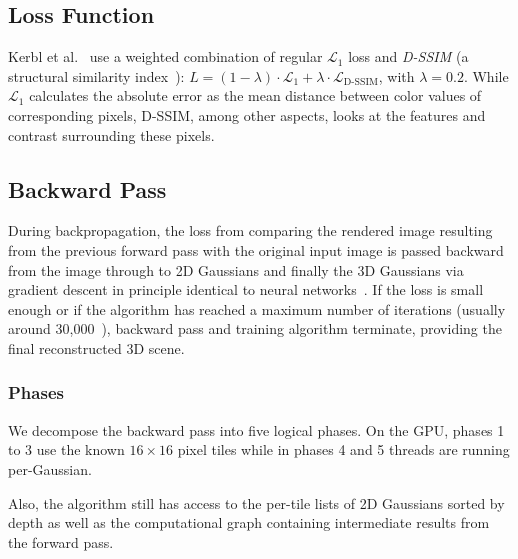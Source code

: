 \vspace{-5pt}
\subsection{Loss Function}
\vspace{-3pt}
Kerbl et al.~\cite{kerbl3DGaussianSplatting2023} use a weighted combination of regular $\mathcal{L}_1$ loss and \textit{D-SSIM} (a structural similarity index~\cite{wangImageQualityAssessment2004}):
$L = (1 - \lambda) \cdot \mathcal{L}_1 + \lambda \cdot \mathcal{L}_\text{D-SSIM}$, with $\lambda=0.2$. While $\mathcal{L}_1$ calculates the absolute error as the mean distance between color values of corresponding pixels, D-SSIM, among other aspects, looks at the features and contrast surrounding these pixels.

\subsection{Backward Pass}
\label{ch:backprop}
During backpropagation, the loss from comparing the rendered image resulting from the previous forward pass with the original input image is passed backward from the image through to 2D Gaussians and finally the 3D Gaussians via gradient descent in principle identical to neural networks~\cite{thimm2025ML}.
If the loss is small enough or if the algorithm has reached a maximum number of iterations (usually around 30,000~\cite{kerbl3DGaussianSplatting2023}), backward pass and training algorithm terminate, providing the final reconstructed 3D scene.

\vspace{-8pt}
\subsubsection{Phases}
\label{ch:backprop:phases}
\vspace{-3pt}
We decompose the backward pass into five logical phases. On the GPU, phases 1 to 3 use the known $16\times 16$ pixel tiles while in phases 4 and 5 threads are running per-Gaussian.

Also, the algorithm still has access to the per-tile lists of 2D Gaussians sorted by depth as well as the computational graph containing intermediate results from the forward pass.

